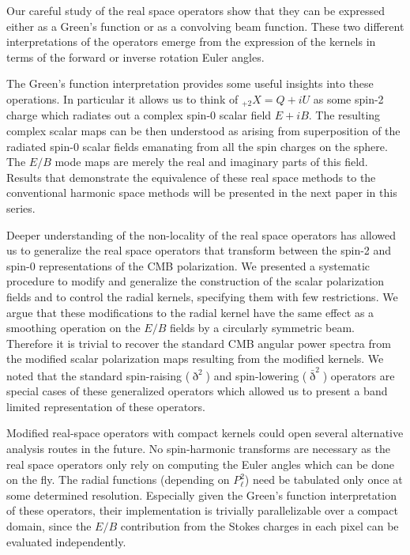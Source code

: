 Our careful study of the real space operators show that they can be expressed either as a Green's function or as a convolving beam function.   These two different interpretations of the operators emerge from the expression of the kernels in terms of the forward or inverse rotation Euler angles.  

The Green's function interpretation provides some useful insights into these operations. In particular it allows us to think of ${}_{+2}X=Q+iU$ as some spin-2 charge which radiates out a complex spin-0 scalar field $E+iB$. The resulting complex scalar maps can be then understood as arising from superposition of the radiated spin-0 scalar fields emanating from all the spin charges on the sphere.  The $E/B$ mode maps are merely the real and imaginary parts of this field. Results that demonstrate the equivalence of these real space methods to the conventional harmonic space methods will be presented in the next paper in this series.

Deeper understanding of the non-locality of the real space operators has allowed us to generalize the real space operators that transform between the spin-2 and spin-0 representations of the CMB polarization. We presented a systematic procedure to modify and generalize the construction of the scalar polarization fields and to control the radial kernels, specifying them with few restrictions.  We argue that these modifications to the radial kernel have the same effect as a smoothing operation on the $E/B$ fields by a circularly symmetric beam.  Therefore it is trivial to recover the standard CMB angular power spectra from the modified scalar polarization maps resulting from the modified kernels.  We noted that the standard spin-raising ($\eth^2$) and spin-lowering ($\bar{\eth}^2$) operators are special cases of these generalized operators which allowed us to present a band limited representation of these operators. 



Modified real-space operators with compact kernels could open several alternative analysis routes in the future.  No spin-harmonic transforms are necessary as the real space operators only rely on computing the Euler angles which can be done on the fly.  The radial functions (depending on $P_{\ell}^{2}$) need be tabulated only once at some determined resolution.  Especially given the Green's function interpretation of these operators, their implementation is trivially parallelizable over a compact domain, since the $E/B$ contribution from the Stokes charges in each pixel can be evaluated independently.  

